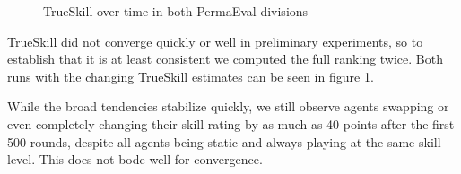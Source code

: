 \begin{figure}[H]
\centering
{}
\caption{TrueSkill over time in both PermaEval divisions}
\label{TrueSkillCompare}
\end{figure}

TrueSkill did not converge quickly or well in preliminary experiments, so to establish that it is at least consistent we computed the full ranking twice. Both runs with the changing TrueSkill estimates can be seen in figure \ref{TrueSkillCompare}.

While the broad tendencies stabilize quickly, we still observe agents swapping or even completely changing their skill rating by as much as 40 points after the first 500 rounds, despite all agents being static and always playing at the same skill level. This does not bode well for convergence.

